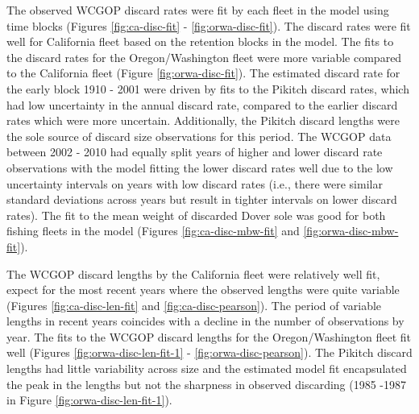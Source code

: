\documentclass[11pt,
  english,
  a4paper,
]{article}
\begin{document}
The observed WCGOP discard rates were fit by each fleet in the model using time blocks (Figures \ref{fig:ca-disc-fit} - \ref{fig:orwa-disc-fit}). The discard rates were fit well for California fleet based on the retention blocks in the model. The fits to the discard rates for the Oregon/Washington fleet were more variable compared to the California fleet (Figure \ref{fig:orwa-disc-fit}). The estimated discard rate for the early block 1910 - 2001 were driven by fits to the Pikitch discard rates, which had low uncertainty in the annual discard rate, compared to the earlier discard rates which were more uncertain. Additionally, the Pikitch discard lengths were the sole source of discard size observations for this period. The WCGOP data between 2002 - 2010 had equally split years of higher and lower discard rate observations with the model fitting the lower discard rates well due to the low uncertainty intervals on years with low discard rates (i.e., there were similar standard deviations across years but result in tighter intervals on lower discard rates). The fit to the mean weight of discarded Dover sole was good for both fishing fleets in the model (Figures \ref{fig:ca-disc-mbw-fit} and \ref{fig:orwa-disc-mbw-fit}).

\leavevmode\tagmcend\tagstructend\par


The WCGOP discard lengths by the California fleet were relatively well fit, expect for the most recent years where the observed lengths were quite variable (Figures \ref{fig:ca-disc-len-fit} and \ref{fig:ca-disc-pearson}). The period of variable lengths in recent years coincides with a decline in the number of observations by year. The fits to the WCGOP discard lengths for the Oregon/Washington fleet fit well (Figures \ref{fig:orwa-disc-len-fit-1} - \ref{fig:orwa-disc-pearson}). The Pikitch discard lengths had little variability across size and the estimated model fit encapsulated the peak in the lengths but not the sharpness in observed discarding (1985 -1987 in Figure \ref{fig:orwa-disc-len-fit-1}).

\leavevmode\tagmcend\tagstructend\par

\end{document}
